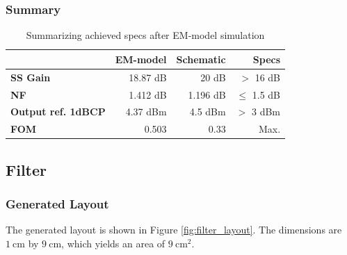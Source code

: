 \documentclass[a4paper]{article}        %
\begin{document}
		\subsubsection{Summary}

			\begin{table}[H]
			\centering
			\begin{tabular}{|l|r|r|r|}
				\hline
				 &  \textbf{EM-model} &  \textbf{Schematic} & \textbf{Specs} \\
				\hline
				\textbf{SS Gain} & 18.87 dB &  20 dB & $>$ 16 dB \\
				\hline
				\textbf{NF} & 1.412 dB & 1.196 dB & $\leq$ 1.5 dB \\
				\hline
				\textbf{Output ref. 1dBCP} & 4.37 dBm & 4.5 dBm & $>$ 3 dBm \\
				\hline
				\textbf{FOM} & 0.503 & 0.33 & Max. \\
				\hline
			\end{tabular}
			\caption{Summarizing achieved specs after EM-model simulation}
			\label{tab:lna_em_summ}
			\end{table}


	\subsection{Filter}
		\subsubsection{Generated Layout}
			The generated layout is shown in Figure \ref{fig:filter_layout}. The dimensions are $\SI{1}{\centi\meter}$ by $\SI{9}{\centi\meter}$, which yields an area of $\SI{9}{\centi\meter\squared}$. 
\end{document}
